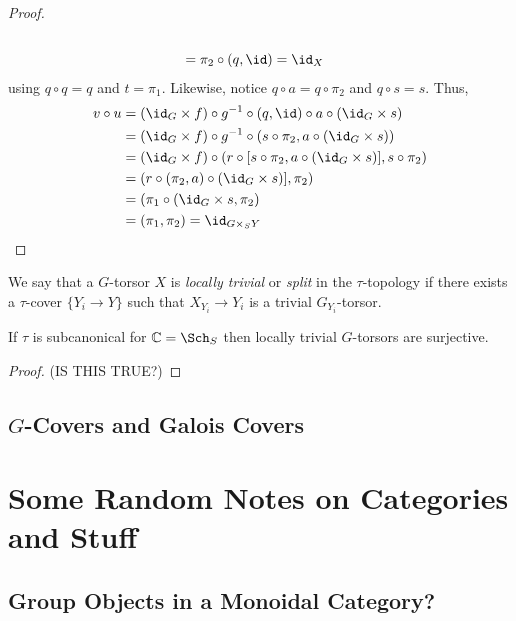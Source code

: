 \documentclass[12pt]{article}
\begin{document}
\begin{proof}
\begin{align*}
\\
& = \pi_2 \circ (q, \id) = \id_X
\end{align*}
using $q \circ q = q$ and $t = \pi_1$. Likewise, notice $q \circ a = q \circ \pi_2$ and $q \circ s = s$. Thus,
\begin{align*}
v \circ u & = (\id_G \times f) \circ g^{-1} \circ (q, \id) \circ a \circ (\id_G \times s)
\\
& = (\id_G \times f) \circ g^{-1} \circ (s \circ \pi_2, a \circ (\id_G \times s))
\\
& = (\id_G \times f) \circ (r \circ [s \circ \pi_2, a \circ (\id_G \times s)], s \circ \pi_2)
\\
& = (r \circ (\pi_2, a) \circ (\id_G \times s)], \pi_2)
\\
& = (\pi_1 \circ (\id_G \times s, \pi_2)
\\
& = (\pi_1, \pi_2) = \id_{G \times_S Y}
\end{align*}
\end{proof}

\begin{defn}
We say that a $G$-torsor $X$ is \textit{locally trivial} or \textit{split} in the $\tau$-topology if there exists a $\tau$-cover $\{ Y_i \to Y \}$ such that $X_{Y_i} \to Y_i$ is a trivial $G_{Y_i}$-torsor.
\end{defn}

\begin{prop}
If $\tau$ is subcanonical for $\C = \Sch_{S}$ then locally trivial $G$-torsors are surjective.
\end{prop}

\begin{proof}
(IS THIS TRUE?)
\end{proof}

\subsection{$G$-Covers and Galois Covers}

\section{Some Random Notes on Categories and Stuff}

\subsection{Group Objects in a Monoidal Category?}
\end{document}
